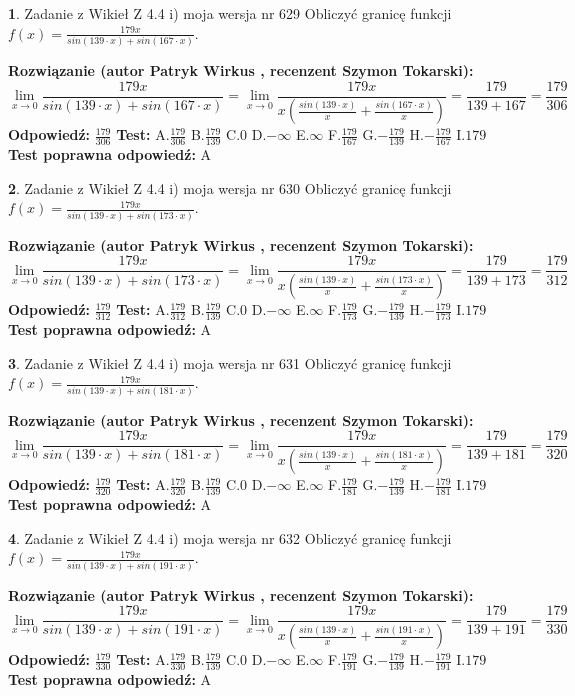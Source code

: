 \documentclass[12pt, a4paper]{article}
\theoremstyle{definition} %
\newtheorem{zad}{}
\newcommand{\zadStart}[1]{\begin{zad}#1\newline}
\newcommand{\zadStop}{\end{zad}}
\newcommand{\rozwStart}[2]{\noindent \textbf{Rozwiązanie (autor #1 , recenzent #2): }\newline}
\newcommand{\rozwStop}{\newline}
\newcommand{\odpStart}{\noindent \textbf{Odpowiedź:}\newline}
\newcommand{\odpStop}{\newline}
\newcommand{\testStart}{\noindent \textbf{Test:}\newline}
\newcommand{\testStop}{\newline}
\newcommand{\kluczStart}{\noindent \textbf{Test poprawna odpowiedź:}\newline}
\newcommand{\kluczStop}{\newline}
\begin{document}
\zadStart{Zadanie z Wikieł Z 4.4 i) moja wersja nr 629}
Obliczyć granicę funkcji $f(x)=\frac{179x}{sin(139\cdot x) +sin(167\cdot x)}$.
\zadStop
\rozwStart{Patryk Wirkus}{Szymon Tokarski}
$$\lim\limits_{x\to 0}\frac{179x}{sin(139\cdot x) +sin(167\cdot x)}=\lim\limits_{x\to 0}\frac{179x}{x(\frac{sin(139\cdot x)}{x}+\frac{sin(167\cdot x)}{x})}=\frac{179}{139+167} = \frac{179}{306}$$
\rozwStop
\odpStart
$\frac{179}{306}$
\odpStop
\testStart
A.$\frac{179}{306}$
B.$\frac{179}{139}$
C.$0$
D.$-\infty$
E.$\infty$
F.$\frac{179}{167}$
G.$-\frac{179}{139}$
H.$-\frac{179}{167}$
I.$179$
\testStop
\kluczStart
A
\kluczStop



\zadStart{Zadanie z Wikieł Z 4.4 i) moja wersja nr 630}
Obliczyć granicę funkcji $f(x)=\frac{179x}{sin(139\cdot x) +sin(173\cdot x)}$.
\zadStop
\rozwStart{Patryk Wirkus}{Szymon Tokarski}
$$\lim\limits_{x\to 0}\frac{179x}{sin(139\cdot x) +sin(173\cdot x)}=\lim\limits_{x\to 0}\frac{179x}{x(\frac{sin(139\cdot x)}{x}+\frac{sin(173\cdot x)}{x})}=\frac{179}{139+173} = \frac{179}{312}$$
\rozwStop
\odpStart
$\frac{179}{312}$
\odpStop
\testStart
A.$\frac{179}{312}$
B.$\frac{179}{139}$
C.$0$
D.$-\infty$
E.$\infty$
F.$\frac{179}{173}$
G.$-\frac{179}{139}$
H.$-\frac{179}{173}$
I.$179$
\testStop
\kluczStart
A
\kluczStop



\zadStart{Zadanie z Wikieł Z 4.4 i) moja wersja nr 631}
Obliczyć granicę funkcji $f(x)=\frac{179x}{sin(139\cdot x) +sin(181\cdot x)}$.
\zadStop
\rozwStart{Patryk Wirkus}{Szymon Tokarski}
$$\lim\limits_{x\to 0}\frac{179x}{sin(139\cdot x) +sin(181\cdot x)}=\lim\limits_{x\to 0}\frac{179x}{x(\frac{sin(139\cdot x)}{x}+\frac{sin(181\cdot x)}{x})}=\frac{179}{139+181} = \frac{179}{320}$$
\rozwStop
\odpStart
$\frac{179}{320}$
\odpStop
\testStart
A.$\frac{179}{320}$
B.$\frac{179}{139}$
C.$0$
D.$-\infty$
E.$\infty$
F.$\frac{179}{181}$
G.$-\frac{179}{139}$
H.$-\frac{179}{181}$
I.$179$
\testStop
\kluczStart
A
\kluczStop



\zadStart{Zadanie z Wikieł Z 4.4 i) moja wersja nr 632}
Obliczyć granicę funkcji $f(x)=\frac{179x}{sin(139\cdot x) +sin(191\cdot x)}$.
\zadStop
\rozwStart{Patryk Wirkus}{Szymon Tokarski}
$$\lim\limits_{x\to 0}\frac{179x}{sin(139\cdot x) +sin(191\cdot x)}=\lim\limits_{x\to 0}\frac{179x}{x(\frac{sin(139\cdot x)}{x}+\frac{sin(191\cdot x)}{x})}=\frac{179}{139+191} = \frac{179}{330}$$
\rozwStop
\odpStart
$\frac{179}{330}$
\odpStop
\testStart
A.$\frac{179}{330}$
B.$\frac{179}{139}$
C.$0$
D.$-\infty$
E.$\infty$
F.$\frac{179}{191}$
G.$-\frac{179}{139}$
H.$-\frac{179}{191}$
I.$179$
\testStop
\kluczStart
A
\kluczStop
\end{document}
